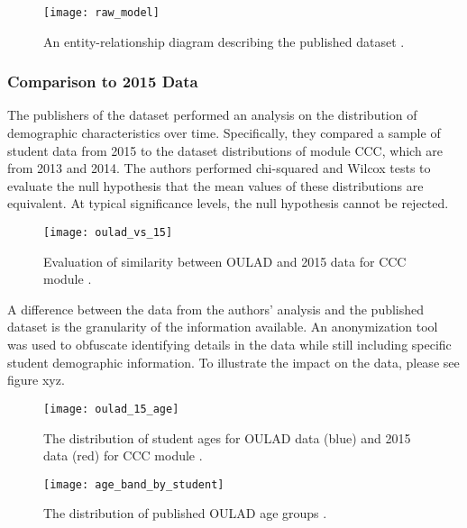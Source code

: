 \documentclass{article}
\begin{document}
            \begin{figure}
                \centering
                \texttt{[image: raw\_model]}
                \caption{An entity-relationship diagram describing the published dataset \cite{oulad}.}
                \label{fig:oulad_schema}
            \end{figure}
        
        \subsubsection{Comparison to 2015 Data}
            The publishers of the dataset performed an analysis on the distribution of demographic characteristics over time.
            Specifically, they compared a sample of student data from 2015 to the dataset distributions of module CCC, which are from 2013 and 2014.
            The authors performed chi-squared and Wilcox tests to evaluate the null hypothesis that the mean values of these distributions are equivalent.
            At typical significance levels, the null hypothesis cannot be rejected.

            \begin{figure}
                \centering
                \texttt{[image: oulad\_vs\_15]}
                \caption{Evaluation of similarity between OULAD and 2015 data for CCC module \cite{oulad}.}
                \label{fig:oulad_vs_15}
            \end{figure}

            A difference between the data from the authors' analysis and the published dataset is the granularity of the information available.
            An anonymization tool was used to obfuscate identifying details in the data while still including specific student demographic information. 
            To illustrate the impact on the data, please see figure xyz.
            \begin{figure}
                \centering
                \texttt{[image: oulad\_15\_age]}
                \caption{The distribution of student ages for OULAD data (blue) and 2015 data (red) for CCC module \cite{oulad}.}
                \label{fig:oulad_15_age}
            \end{figure}
            \begin{figure}
                \centering
                \texttt{[image: age\_band\_by\_student]}
                \caption{The distribution of published OULAD age groups \cite{oulad}.}
                \label{fig:age_band_by_student}
            \end{figure}
            
\end{document}
